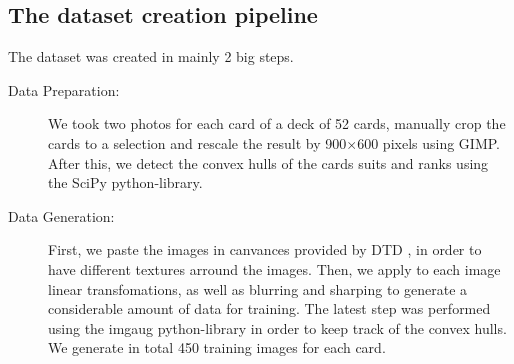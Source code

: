 \documentclass[a0,landscape]{a0poster}
\begin{document}
\begin{multicols}{3}
\subsection*{The dataset creation pipeline}
The dataset was created in mainly 2 big steps. \\
\begin{description}
\item[Data Preparation: ] We took two photos for each card of a deck of 52 cards, manually crop the cards to a selection and rescale the result by 900$\times$600 pixels using GIMP.
After this, we detect the convex hulls of the cards suits and ranks using the SciPy python-library.  \\
\item[Data Generation: ]  First, we paste the images in canvances provided by DTD \cite{cimpoi14describing}, in order to have different textures arround the images.
Then, we apply to each image linear transfomations, as well as blurring and sharping to generate a considerable amount of data for training.
The latest step was performed using the imgaug python-library in order to keep track of the convex hulls. \\
We generate in total 450 training images for each card. 
\end{description}





\end{multicols}
\end{document}
